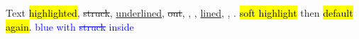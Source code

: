 \usepackage{soul}
\usepackage[normalem]{ulem}
Text \hl{highlighted}, \st{struck}, \ul{underlined}, \sout{out}, , , \uline{lined}, , .
{\hl{soft highlight}} then \hl{default again}.
\textcolor{blue}{blue with \sout{struck} inside}
